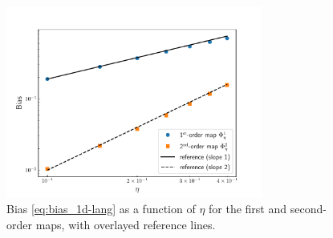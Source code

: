 \begin{figure}[ht]
	\centering
	\includegraphics[width=0.75\textwidth]{1d-lang_bias.pdf}
	\caption{Bias \eqref{eq:bias_1d-lang} as a function of $\eta$ for the first and second-order maps, with overlayed reference lines.}
	\label{fig:1d_lang_bias}
\end{figure}


